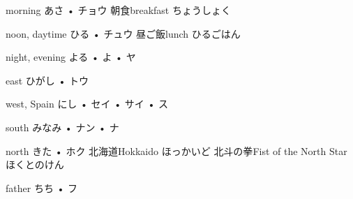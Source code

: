 



\setcounter{cardnum}{1}

		{morning}
		{あさ • チョウ}
		{朝食}{breakfast ちょうしょく}
		{}{}
		{}{}
		{}{}
		{}{}

		{noon, daytime}
		{ひる • チュウ}
		{昼ご飯}{lunch ひるごはん}
		{}{}
		{}{}
		{}{}
		{}{}

		{night, evening}
		{よる • よ • ヤ}
		{}{}
		{}{}
		{}{}
		{}{}
		{}{}

		{east}
		{ひがし • トウ}
		{}{}
		{}{}
		{}{}
		{}{}
		{}{}

		{west, Spain}
		{にし • セイ • サイ • ス}
		{}{}
		{}{}
		{}{}
		{}{}
		{}{}

		{south}
		{みなみ • ナン • ナ}
		{}{}
		{}{}
		{}{}
		{}{}
		{}{}

		{north}
		{きた • ホク}
		{北海道}{Hokkaido ほっかいど}
		{北斗の拳}{Fist of the North Star ほくとのけん}
		{}{}
		{}{}
		{}{}

		{father}
		{ちち • フ}
		{}{}
		{}{}
		{}{}
		{}{}
		{}{}

